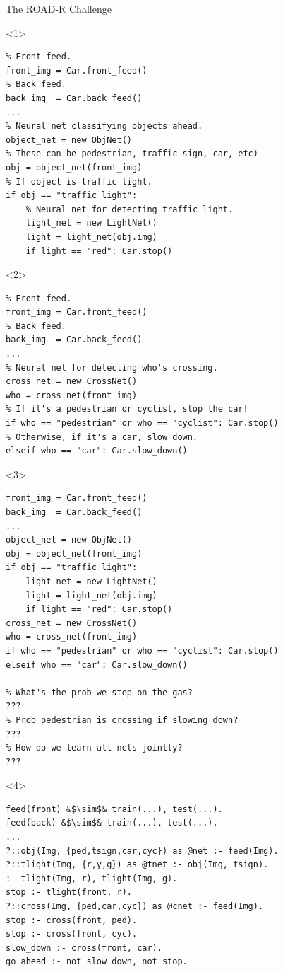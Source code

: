 \documentclass[aspectratio=169]{beamer}
\begin{document}
\begin{frame}[fragile]{The ROAD-R Challenge}
\begin{minipage}[c]{0.55\textwidth}
\begin{onlyenv}<1>
  \begin{verbatim}
% Front feed.
front_img = Car.front_feed()
% Back feed.
back_img  = Car.back_feed()
...
% Neural net classifying objects ahead.
object_net = new ObjNet()
% These can be pedestrian, traffic sign, car, etc)
obj = object_net(front_img)
% If object is traffic light.
if obj == "traffic light":
    % Neural net for detecting traffic light.
    light_net = new LightNet()
    light = light_net(obj.img)
    if light == "red": Car.stop()
  \end{verbatim}
\end{onlyenv}
\begin{onlyenv}<2>
  \begin{verbatim}
% Front feed.
front_img = Car.front_feed()
% Back feed.
back_img  = Car.back_feed()
...
% Neural net for detecting who's crossing.
cross_net = new CrossNet()
who = cross_net(front_img)
% If it's a pedestrian or cyclist, stop the car!
if who == "pedestrian" or who == "cyclist": Car.stop()
% Otherwise, if it's a car, slow down.
elseif who == "car": Car.slow_down()
  \end{verbatim}
\end{onlyenv}
\begin{onlyenv}<3>
  \begin{verbatim}
front_img = Car.front_feed()
back_img  = Car.back_feed()
...
object_net = new ObjNet()
obj = object_net(front_img)
if obj == "traffic light":
    light_net = new LightNet()
    light = light_net(obj.img)
    if light == "red": Car.stop()
cross_net = new CrossNet()
who = cross_net(front_img)
if who == "pedestrian" or who == "cyclist": Car.stop()
elseif who == "car": Car.slow_down()

% What's the prob we step on the gas?
???
% Prob pedestrian is crossing if slowing down?
???
% How do we learn all nets jointly?
???
  \end{verbatim}
\end{onlyenv}
\begin{onlyenv}<4>
  \begin{verbatim}
feed(front) &$\sim$& train(...), test(...).
feed(back) &$\sim$& train(...), test(...).
...
?::obj(Img, {ped,tsign,car,cyc}) as @net :- feed(Img).
?::tlight(Img, {r,y,g}) as @tnet :- obj(Img, tsign).
:- tlight(Img, r), tlight(Img, g).
stop :- tlight(front, r).
?::cross(Img, {ped,car,cyc}) as @cnet :- feed(Img).
stop :- cross(front, ped).
stop :- cross(front, cyc).
slow_down :- cross(front, car).
go_ahead :- not slow_down, not stop.


\end{verbatim}
\end{onlyenv}
\end{minipage}
\end{frame}
\end{document}
